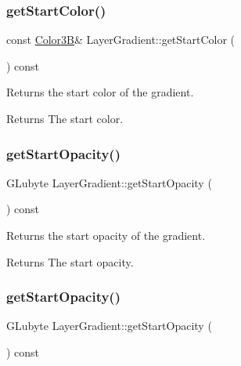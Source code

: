 \subsubsection{\texorpdfstring{get\+Start\+Color()}{getStartColor()}\hspace{0.1cm}{\footnotesize\ttfamily [2/2]}}
{\footnotesize\ttfamily const \hyperlink{structColor3B}{Color3B}\& Layer\+Gradient\+::get\+Start\+Color (\begin{DoxyParamCaption}{ }\end{DoxyParamCaption}) const}

Returns the start color of the gradient.

\begin{DoxyReturn}{Returns}
The start color. 
\end{DoxyReturn}
\mbox{\label{classLayerGradient_ab1f50492888f24a3a86c8f43f4da7711}} 
\subsubsection{\texorpdfstring{get\+Start\+Opacity()}{getStartOpacity()}\hspace{0.1cm}{\footnotesize\ttfamily [1/2]}}
{\footnotesize\ttfamily G\+Lubyte Layer\+Gradient\+::get\+Start\+Opacity (\begin{DoxyParamCaption}{ }\end{DoxyParamCaption}) const}

Returns the start opacity of the gradient.

\begin{DoxyReturn}{Returns}
The start opacity. 
\end{DoxyReturn}
\mbox{\label{classLayerGradient_ab1f50492888f24a3a86c8f43f4da7711}} 
\subsubsection{\texorpdfstring{get\+Start\+Opacity()}{getStartOpacity()}\hspace{0.1cm}{\footnotesize\ttfamily [2/2]}}
{\footnotesize\ttfamily G\+Lubyte Layer\+Gradient\+::get\+Start\+Opacity (\begin{DoxyParamCaption}{ }\end{DoxyParamCaption}) const}

